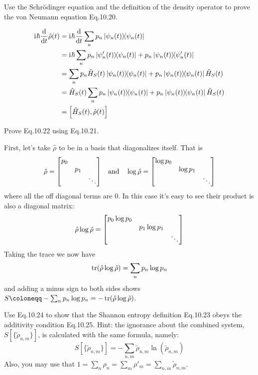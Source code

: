 \documentclass[boxes,pages]{homework}
\makeatletter
\newcommand{\iu}{\mathrm{i}\mkern1mu}
\numberwithin{@problem}{section}
\makeatother
\begin{document}
\begin{problem}
Use the Schr\"odinger equation and the definition of the density operator to prove the von Neumann equation Eq.10.20.
\end{problem}

\begin{solution}
	\begin{align*}
		\iu\hbar\dv{t}\hat{\rho}(t) & = \iu\hbar\dv{t}\sum_np_n\ketbra{\psi_n(t)}                                                          \\
		                            & = \iu\hbar\sum_n p_n\ketbra{\psi_n'(t)}{\psi_n(t)} + p_n\ketbra{\psi_n(t)}{\psi_n'(t)}               \\
		                            & = \sum_n p_n\hat{H}_S(t)\ketbra{\psi_n(t)}{\psi_n(t)} + p_n\ketbra{\psi_n(t)}{\psi_n(t)}\hat{H}_S(t) \\
		                            & = \hat{H}_S(t)\sum_n p_n\ketbra{\psi_n(t)}{\psi_n(t)} + p_n\ketbra{\psi_n(t)}{\psi_n(t)}\hat{H}_S(t) \\
		                            & = \comm{\hat{H}_S(t)}{\hat{\rho}(t)}
	\end{align*}
\end{solution}

\begin{problem}
Prove Eq.10.22 using Eq.10.21.
\end{problem}

\begin{solution}
	First, let's take $\hat{\rho}$ to be in a basis that diagonalizes itself.
	That is
	\begin{equation*}
		\hat{\rho} = \mqty[\dmat{p_0, p_1,\ddots}] \quad \text{and} \quad \log\hat{\rho} = \mqty[\dmat{\log p_0, \log p_1, \ddots}]
	\end{equation*}
	where all the off diagonal terms are 0.
	In this case it's easy to see their product is also a diagonal matrix:
	\begin{equation*}
		\hat{\rho}\log\hat{\rho} = \mqty[\dmat{p_0\log p_0, p_1\log p_1, \ddots}]
	\end{equation*}
	Taking the trace we now have
	\begin{equation*}
		\tr(\hat{\rho}\log\hat{\rho}) = \sum_n p_n\log p_n
	\end{equation*}
	and adding a minus sign to both sides shows $S \coloneqq -\sum_n p_n\log p_n = -\tr(\hat{\rho}\log\hat{\rho})$.
\end{solution}

\begin{problem}
Use Eq.10.24 to  show that the Shannon entropy definition Eq.10.23 obeys the additivity condition Eq.10.25. Hint: the ignorance about the combined system, $S[\{\tilde{\rho}_{n,m}\}]$, is calculated with the same formula, namely:
\[
	S[\{\tilde{\rho}_{n,m}\}] = -\sum_{n, m}\tilde{\rho}_{n, m}\ln(\tilde{\rho}_{n,m})
\]
Also, you may use that $1 = \sum_n \rho_n = \sum_m\rho'_m = \sum_{n, m}\tilde{\rho}_{n,m}$.
\end{problem}
\end{document}
